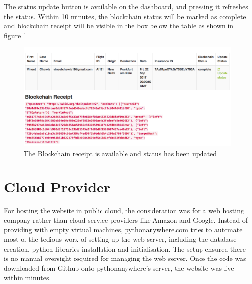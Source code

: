 The status update button is available on the dashboard, and pressing it refreshes the status. Within 10 minutes, the blockchain status will be marked as complete and blockchain receipt will be visible in the box below the table as shown in figure \ref{fig:complete_dashboard}

\begin{figure}[H]
    \centering
    \includegraphics[width=\textwidth]{Figures/complete_dashboard.png}
    \caption{The Blockchain receipt is available and status has been updated}
    \label{fig:complete_dashboard}
\end{figure}

\section{Cloud Provider}
For hosting the website in public cloud, the consideration was for a web hosting company rather than cloud service providers like Amazon and Google. Instead of providing with empty virtual machines, pythonanywhere.com tries to automate most of the tedious work of setting up the web server, including the database creation, python libraries installation and initialisation. 
The setup ensured there is no manual oversight required for managing the web server. Once the code was downloaded from Github onto pythonanywhere's server, the website was live within minutes.



